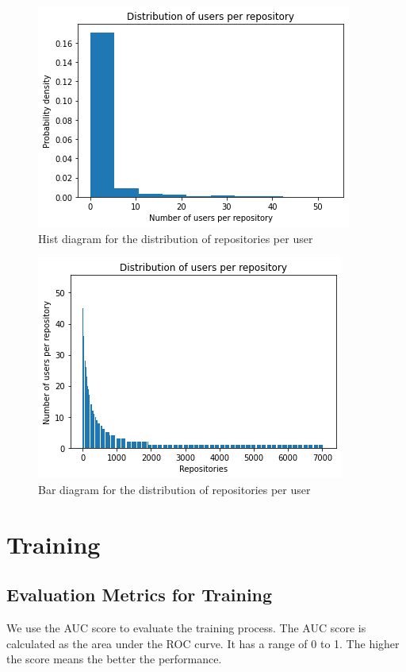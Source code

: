 \documentclass[11pt,twoside]{report}
\begin{document}
\begin{figure}[H]
    \centering
    \includegraphics[scale=0.9]{user_repo_dist_hist.png}
    \caption{Hist diagram for the distribution of repositories per user}
    \label{fig:user_repo_dist_hist}
\end{figure}

\begin{figure}[H]
    \centering
    \includegraphics[scale=0.9]{user_repo_dist_bar.png}
    \caption{Bar diagram for the distribution of repositories per user}
    \label{fig:user_repo_dist_bar}
\end{figure}

\section{Training}
\subsection{Evaluation Metrics for Training}
We use the AUC score to evaluate the training process. The AUC score is calculated as the area under the ROC curve. It has a range of 0 to 1. The higher the score means the better the performance.
\end{document}
